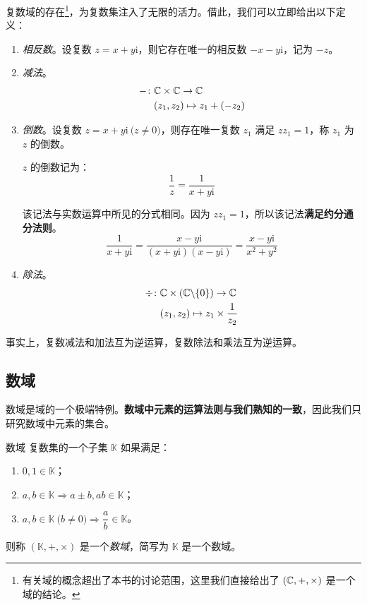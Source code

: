 复数域的存在\footnote{有关域的概念超出了本书的讨论范围，这里我们直接给出了 $(\mathbb C, {+}, {\times})$ 是一个域的结论。}，为复数集注入了无限的活力。借此，我们可以立即给出以下定义：
\begin{enumerate}
	\item \emph{相反数}。设复数 $z = x + y \mathrm i$，则它存在唯一的相反数 $-x - y \mathrm i$，记为 $-z$。
	\item \emph{减法}。
	$$
	\begin{aligned}
		{-} \colon & \mathbb C \times \mathbb C \to \mathbb C
		\\&
		(z_1, z_2) \mapsto z_1 + (-z_2)
	\end{aligned}
	$$
	\item \emph{倒数}。设复数 $z = x + y \mathrm i \pod{z \ne 0}$，则存在唯一复数 $z_1$ 满足 $z z_1 = 1$，称 $z_1$ 为 $z$ 的倒数。

	$z$ 的倒数记为：
	$$
	\dfrac{1}{z} = \dfrac{1}{x + y \mathrm i}
	$$

	该记法与实数运算中所见的分式相同。因为 $z z_1 = 1$，所以该记法\textbf{满足约分通分法则}。
	$$
	\dfrac{1}{x + y \mathrm i} = \dfrac{x - y \mathrm i}{(x + y \mathrm i)(x - y \mathrm i)} = \dfrac{x - y \mathrm i}{x^2 + y^2}
	$$
	\item \emph{除法}。
	$$
	\begin{aligned}
		{\div} \colon & \mathbb C \times (\mathbb C \backslash \{0\}) \to \mathbb C
		\\&
		(z_1, z_2) \mapsto z_1 \times \dfrac{1}{z_2}
	\end{aligned}
	$$
\end{enumerate}

事实上，复数减法和加法互为逆运算，复数除法和乘法互为逆运算。

\subsection{数域}

数域是域的一个极端特例。\textbf{数域中元素的运算法则与我们熟知的一致}，因此我们只研究数域中元素的集合。

\begin{definition}{数域}
	复数集的一个子集 $\mathbb K$ 如果满足：
	\begin{enumerate}
		\item $0, 1 \in \mathbb K$；
		\item $a, b \in \mathbb K \Longrightarrow a \pm b, ab \in \mathbb K$；
		\item $a, b \in \mathbb K \pod{b \ne 0} \Longrightarrow \dfrac{a}{b} \in \mathbb K$。
	\end{enumerate}

	则称 $(\mathbb K, {+}, {\times})$ 是一个\emph{数域}，简写为 $\mathbb K$ 是一个数域。
\end{definition}

